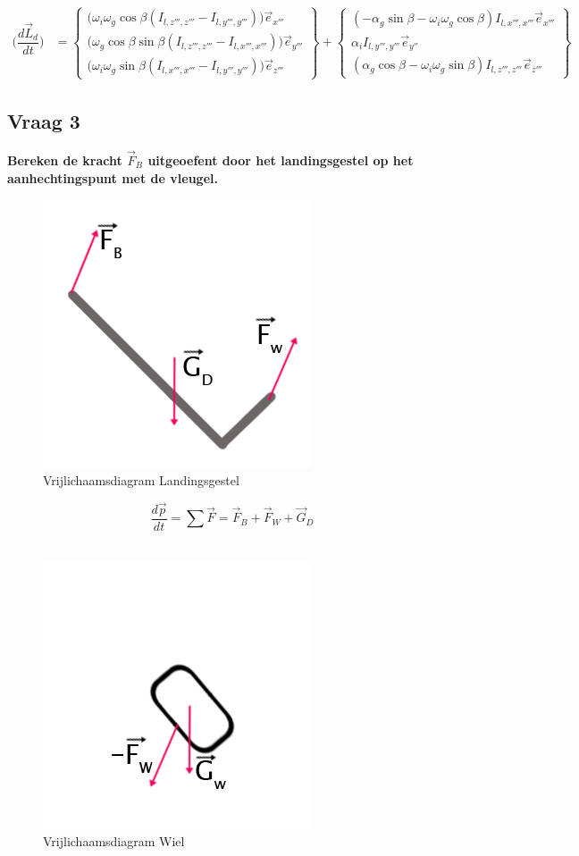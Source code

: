 \documentclass[a4paper,10pt]{article}
\begin{document}
\begin{equation}
	\begin{aligned}
	\Big(\dfrac{d\vec{L}_d}{dt}\Big) &= \begin{Bmatrix}
	\Big( \omega_i \omega_g\cos{\beta} (I_{l,z''',z'''} - I_{l,y''',y'''}) \Big) \vec{e}_{x'''}\\
	\Big(\omega_g\cos{\beta}\sin{\beta}(I_{l,z''',z'''} - I_{l,x''',x'''})\Big) \vec{e}_{y'''} \\
	\Big(\omega_i \omega_g\sin{\beta}(I_{l,x''',x'''} - I_{l,y''',y'''})\Big)\vec{e}_{z'''}
	\end{Bmatrix} + \begin{Bmatrix}
	(-\alpha_g \sin{\beta} - \omega_i\omega_g\cos{\beta})I_{l,x''',x'''}\vec{e}_{x'''}\\
	\alpha_iI_{l,y''',y'''}\vec{e}_{y''}\\
	(\alpha_g\cos{\beta}-\omega_i\omega_g\sin{\beta})I_{l,z''',z'''}\vec{e}_{z'''}
	\end{Bmatrix}
	\end{aligned}
\end{equation}
\subsection{Vraag 3}
\textbf{Bereken de kracht $\vec{F}_B$ uitgeoefent door het landingsgestel op het aanhechtingspunt met de vleugel.}

\begin{figure}[H]
\centering
\includegraphics[width=0.4\linewidth, height=0.25\textheight]{Vrijlichaam1}
\caption{Vrijlichaamsdiagram Landingsgestel}
\label{fig:Vrijlichaamsdiagram Landingsgestel}
\end{figure}
\begin{equation}
\dfrac{d\vec{p}}{dt} = \sum	\vec{F}	= \vec{F}_B + \vec{F}_W + \vec{G}_D
\end{equation}\\
\begin{figure}[H]
	\centering
	\includegraphics[width=0.4\linewidth, height=0.25\textheight]{Vrijlichaam2}
	\caption{Vrijlichaamsdiagram Wiel}
	\label{fig:Vrijlichaamsdiagram Wiel}
\end{figure}
\end{document}
